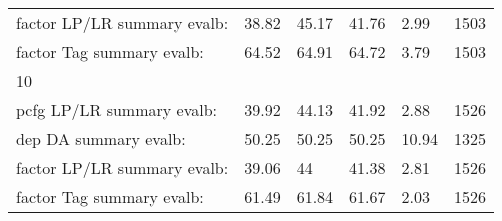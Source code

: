 \begin{longtable}{|p{}|p{}|p{}|p{}|p{}|p{}|}
    factor LP/LR summary evalb: & 38.82 & 45.17 & 41.76 & 2.99 & 1503\\
    factor Tag summary evalb: & 64.52 & 64.91 & 64.72 & 3.79 & 1503\\
    10 &  &  &  &  & \\
    pcfg LP/LR summary evalb: & 39.92 & 44.13 & 41.92 & 2.88 & 1526\\
    dep DA summary evalb: & 50.25 & 50.25 & 50.25 & 10.94 & 1325\\
    factor LP/LR summary evalb: & 39.06 & 44 & 41.38 & 2.81 & 1526\\
    factor Tag summary evalb: & 61.49 & 61.84 & 61.67 & 2.03 & 1526
    \label{tab:cintil_result_full}
\end{longtable}

